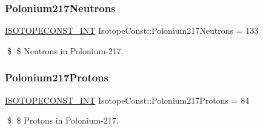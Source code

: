 \subsubsection{\texorpdfstring{Polonium217\+Neutrons}{Polonium217Neutrons}}
{\footnotesize\ttfamily \mbox{\hyperlink{group___isotope_const-_macros_ga5f18360b3e99483a35c32d789e62621c}{I\+S\+O\+T\+O\+P\+E\+C\+O\+N\+S\+T\+\_\+\+I\+NT}} Isotope\+Const\+::\+Polonium217\+Neutrons = 133}

\$ \$ Neutrons in Polonium-\/217. \mbox{\label{group___isotope_const-_polonium-_po217_gad0a5988136b3c297a0f94b408d293120}} 
\subsubsection{\texorpdfstring{Polonium217\+Protons}{Polonium217Protons}}
{\footnotesize\ttfamily \mbox{\hyperlink{group___isotope_const-_macros_ga5f18360b3e99483a35c32d789e62621c}{I\+S\+O\+T\+O\+P\+E\+C\+O\+N\+S\+T\+\_\+\+I\+NT}} Isotope\+Const\+::\+Polonium217\+Protons = 84}

\$ \$ Protons in Polonium-\/217. 